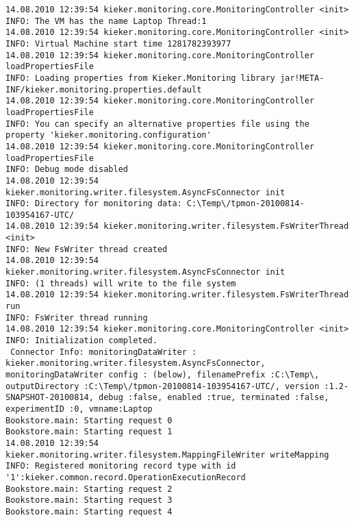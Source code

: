 \setBashListing
\begin{lstlisting}
14.08.2010 12:39:54 kieker.monitoring.core.MonitoringController <init>
INFO: The VM has the name Laptop Thread:1
14.08.2010 12:39:54 kieker.monitoring.core.MonitoringController <init>
INFO: Virtual Machine start time 1281782393977
14.08.2010 12:39:54 kieker.monitoring.core.MonitoringController loadPropertiesFile
INFO: Loading properties from Kieker.Monitoring library jar!META-INF/kieker.monitoring.properties.default
14.08.2010 12:39:54 kieker.monitoring.core.MonitoringController loadPropertiesFile
INFO: You can specify an alternative properties file using the property 'kieker.monitoring.configuration'
14.08.2010 12:39:54 kieker.monitoring.core.MonitoringController loadPropertiesFile
INFO: Debug mode disabled
14.08.2010 12:39:54 kieker.monitoring.writer.filesystem.AsyncFsConnector init
INFO: Directory for monitoring data: C:\Temp\/tpmon-20100814-103954167-UTC/
14.08.2010 12:39:54 kieker.monitoring.writer.filesystem.FsWriterThread <init>
INFO: New FsWriter thread created
14.08.2010 12:39:54 kieker.monitoring.writer.filesystem.AsyncFsConnector init
INFO: (1 threads) will write to the file system
14.08.2010 12:39:54 kieker.monitoring.writer.filesystem.FsWriterThread run
INFO: FsWriter thread running
14.08.2010 12:39:54 kieker.monitoring.core.MonitoringController <init>
INFO: Initialization completed.
 Connector Info: monitoringDataWriter : kieker.monitoring.writer.filesystem.AsyncFsConnector, monitoringDataWriter config : (below), filenamePrefix :C:\Temp\, outputDirectory :C:\Temp\/tpmon-20100814-103954167-UTC/, version :1.2-SNAPSHOT-20100814, debug :false, enabled :true, terminated :false, experimentID :0, vmname:Laptop
Bookstore.main: Starting request 0
Bookstore.main: Starting request 1
14.08.2010 12:39:54 kieker.monitoring.writer.filesystem.MappingFileWriter writeMapping
INFO: Registered monitoring record type with id '1':kieker.common.record.OperationExecutionRecord
Bookstore.main: Starting request 2
Bookstore.main: Starting request 3
Bookstore.main: Starting request 4
\end{lstlisting}